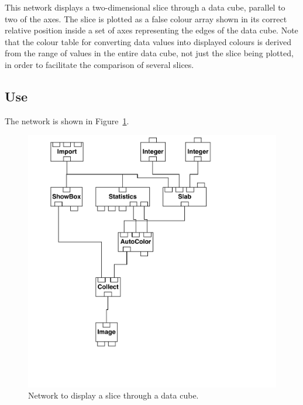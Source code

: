 \documentclass[twoside,11pt]{article}
\begin{document}
This network displays a two-dimensional slice through a data cube,
parallel to two of the axes. The slice is plotted as a false colour
array shown in its correct relative position inside a set of axes
representing the edges of the data cube. Note that the colour table for
converting data values into displayed colours is derived from the range
of values in the entire data cube, not just the slice being plotted,
in order to facilitate the comparison of several slices.

\subsection{Use}

The network is shown in Figure~\ref{SLICNETF}.

\begin{figure}[htbp]

\begin{center}
\leavevmode
\includegraphics[width=553pt]{sc2_slice}
\end{center}

\caption[Network to display a slice through a data cube.]{Network to
display a slice through a data cube. \label{SLICNETF} }

\end{figure}
\end{document}
